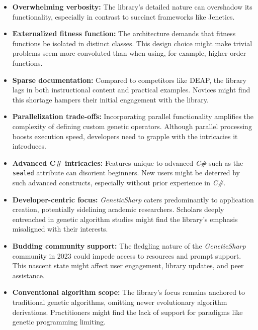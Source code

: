   \begin{itemize}
    \item \textbf{Overwhelming verbosity:} The library's detailed nature can 
      overshadow its functionality, especially in contrast to succinct 
      frameworks like Jenetics.
    \item \textbf{Externalized fitness function:} The architecture demands that 
      fitness functions be isolated in distinct classes.
      This design choice might make trivial problems seem more convoluted than 
      when using, for example, higher-order functions.
    \item \textbf{Sparse documentation:} Compared to competitors like DEAP, the 
      library lags in both instructional content and practical examples.
      Novices might find this shortage hampers their initial engagement with the 
      library.
    \item \textbf{Parallelization trade-offs:} Incorporating parallel 
      functionality amplifies the complexity of defining custom genetic 
      operators.
      Although parallel processing boosts execution speed, developers need to 
      grapple with the intricacies it introduces.
    \item \textbf{Advanced C\# intricacies:} Features unique to advanced 
      \textit{C\#} such as the \texttt{sealed} attribute can 
      disorient beginners.
      New users might be deterred by such advanced constructs, especially 
      without prior experience in \textit{C\#}.
    \item \textbf{Developer-centric focus:} \textit{GeneticSharp} caters 
      predominantly to application creation, potentially sidelining academic 
      researchers.
      Scholars deeply entrenched in genetic algorithm studies might find the 
      library's emphasis misaligned with their interests.
    \item \textbf{Budding community support:} The fledgling nature of the 
      \textit{GeneticSharp} community in 2023 could impede access to resources 
      and prompt support.
      This nascent state might affect user engagement, library updates, and peer 
      assistance.
    \item \textbf{Conventional algorithm scope:} The library's focus remains 
      anchored to traditional genetic algorithms, omitting newer evolutionary 
      algorithm derivations.
      Practitioners might find the lack of support for paradigms like genetic 
      programming limiting.
  \end{itemize}

